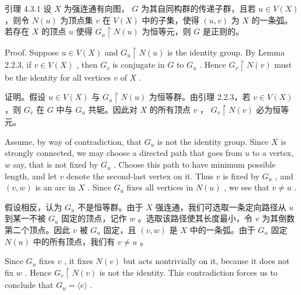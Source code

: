 \documentclass[10pt]{article}
\begin{document}
\begin{tcolorbox}\relax
引理 4.3.1 设 \(X\) 为强连通有向图， \(G\) 为其自同构群的传递子群，且若 \(u \in  V\left( X\right)\) ，则令 \(N\left( u\right)\) 为顶点集 \(v\) 在 \(V\left( X\right)\) 中的子集，使得 \(\left( {u,v}\right)\) 为 \(X\) 的一条弧。若存在 \(X\) 的顶点 \(u\) 使得 \({G}_{u} \upharpoonright  N\left( u\right)\) 为恒等元，则 \(G\) 是正则的。
\end{tcolorbox}

Proof. Suppose \(u \in  V\left( X\right)\) and \({G}_{u} \upharpoonright  N\left( u\right)\) is the identity group. By Lemma 2.2.3, if \(v \in  V\left( X\right)\) , then \({G}_{v}\) is conjugate in \(G\) to \({G}_{u}\) . Hence \({G}_{v} \upharpoonright  N\left( v\right)\) must be the identity for all vertices \(v\) of \(X\) .

\begin{tcolorbox}\relax
证明。假设 \(u \in  V\left( X\right)\) 与 \({G}_{u} \upharpoonright  N\left( u\right)\) 为恒等群。由引理 2.2.3，若 \(v \in  V\left( X\right)\) ，则 \({G}_{v}\) 在 \(G\) 中与 \({G}_{u}\) 共轭。因此对 \(X\) 的所有顶点 \(v\) ， \({G}_{v} \upharpoonright  N\left( v\right)\) 必为恒等元。
\end{tcolorbox}

Assume, by way of contradiction, that \({G}_{u}\) is not the identity group. Since \(X\) is strongly connected, we may choose a directed path that goes from \(u\) to a vertex, \(w\) say, that is not fixed by \({G}_{u}\) . Choose this path to have minimum possible length, and let \(v\) denote the second-last vertex on it. Thus \(v\) is fixed by \({G}_{u}\) , and \(\left( {v,w}\right)\) is an arc in \(X\) . Since \({G}_{u}\) fixes all vertices in \(N\left( u\right)\) , we see that \(v \neq  u\) .

\begin{tcolorbox}\relax
假设相反，认为 \({G}_{u}\) 不是恒等群。由于 \(X\) 强连通，我们可选取一条定向路径从 \(u\) 到某一不被 \({G}_{u}\) 固定的顶点，记作 \(w\) 。选取该路径使其长度最小，令 \(v\) 为其倒数第二个顶点。因此 \(v\) 被 \({G}_{u}\) 固定，且 \(\left( {v,w}\right)\) 是 \(X\) 中的一条弧。由于 \({G}_{u}\) 固定 \(N\left( u\right)\) 中的所有顶点，我们有 \(v \neq  u\) 。
\end{tcolorbox}

Since \({G}_{u}\) fixes \(v\) , it fixes \(N\left( v\right)\) but acts nontrivially on it, because it does not fix \(w\) . Hence \({G}_{v} \upharpoonright  N\left( v\right)\) is not the identity. This contradiction forces us to conclude that \({G}_{u} = \langle e\rangle\) .
\end{document}
